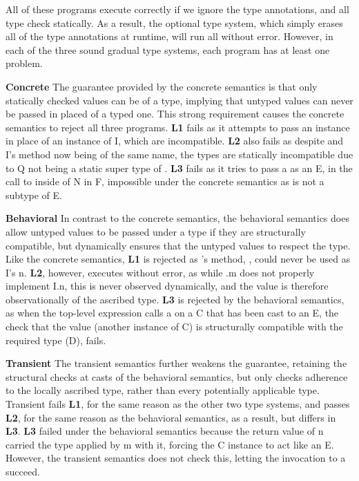 \documentclass{tex/llncs}
\begin{document}
All of these programs execute correctly if we ignore the type annotations, and
all type check statically. As a result, the optional type system, which simply
erases all of the type annotations at runtime, will run all without error.
However, in each of the three sound gradual type systems, each program has at
least one problem.

{\bf Concrete} The guarantee provided by the concrete semantics is that only
statically checked values can be of a type, implying that untyped values can
never be passed in placed of a typed one. This strong requirement causes the
concrete semantics to reject all three programs. {\bf L1} fails as it attempts
to pass an \A instance in place of an instance of \xt I, which are incompatible.
{\bf L2} also fails as despite \A and \xt I's method now being of the same
name, the types are statically incompatible due to \xt Q not being a static
super type of \A. {\bf L3} fails as it tries to pass a \C as an \xt E, in the
call to \m inside of \xt N in \xt F, impossible under the concrete semantics
as \C is not a subtype of \xt E.

{\bf Behavioral} In contrast to the concrete semantics, the behavioral
semantics  does allow untyped values to be passed under a type if they are
structurally compatible, but dynamically ensures that the untyped values to
respect the type. Like the concrete semantics, {\bf L1} is rejected as \A's
method, \m, could never be used as \xt I's \xt n. {\bf L2}, however, executes
without error, as while \A.\xt m does not properly implement \xt I.\xt n, this
is never observed dynamically, and the value is therefore observationally of
the ascribed type. {\bf L3} is rejected by the behavioral semantics, as when
the top-level expression calls \xt a on a \xt C that has been cast to an \xt
E, the check that the value (another instance of \xt C) is structurally
compatible with the required type (\xt D), fails.

{\bf Transient} The transient semantics further weakens the guarantee,
retaining the structural checks at casts of the behavioral semantics, but only
checks adherence to the locally ascribed type, rather than every potentially
applicable type. Transient fails {\bf L1}, for the same reason as the other
two type systems, and passes {\bf L2}, for the same reason as the behavioral
semantics, as a result, but differs in {\bf L3}. {\bf L3} failed under the
behavioral semantics because the return value of \xt n carried the type
applied by \xt m with it, forcing the \xt C instance to act like an \xt E. 
However, the transient semantics does not check this, letting the invocation
to \xt a succeed.
\end{document}
